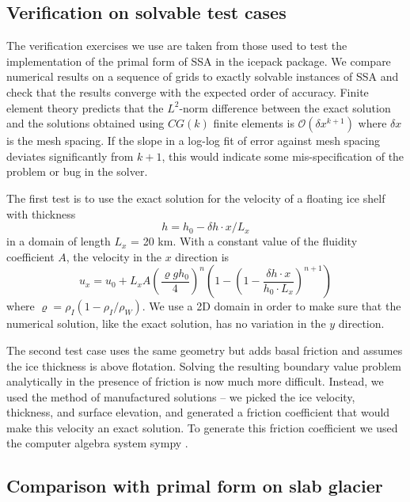 \documentclass[review,oneside]{igs}
\begin{document}
\subsection{Verification on solvable test cases}

The verification exercises we use are taken from those used to test the implementation of the primal form of SSA in the icepack package\citep{shapero2021icepack}.
We compare numerical results on a sequence of grids to exactly solvable instances of SSA and check that the results converge with the expected order of accuracy.
Finite element theory predicts that the $L^2$-norm difference between the exact solution and the solutions obtained using $CG(k)$ finite elements is $\mathscr{O}(\delta x^{k + 1})$ where $\delta x$ is the mesh spacing.
If the slope in a log-log fit of error against mesh spacing deviates significantly from $k + 1$, this would indicate some mis-specification of the problem or bug in the solver.

The first test is to use the exact solution for the velocity of a floating ice shelf with thickness
\begin{equation}
    h = h_0 - \delta h \cdot x / L_x
\end{equation}
in a domain of length $L_x$ = 20 km.
With a constant value of the fluidity coefficient $A$, the velocity in the $x$ direction is
\begin{equation}
    u_x = u_0 + L_x A \left(\frac{\varrho g h_0}{4}\right)^n\left(1 - \left(1 - \frac{\delta h \cdot x}{h_0\cdot L_x}\right)^{n + 1}\right)
\end{equation}
where $\varrho = \rho_I(1 - \rho_I/\rho_W)$.
We use a 2D domain in order to make sure that the numerical solution, like the exact solution, has no variation in the $y$ direction.

The second test case uses the same geometry but adds basal friction and assumes the ice thickness is above flotation.
Solving the resulting boundary value problem analytically in the presence of friction is now much more difficult.
Instead, we used the method of manufactured solutions -- we picked the ice velocity, thickness, and surface elevation, and generated a friction coefficient that would make this velocity an exact solution.
To generate this friction coefficient we used the computer algebra system sympy \citep{sympy}.


\subsection{Comparison with primal form on slab glacier}
\end{document}

